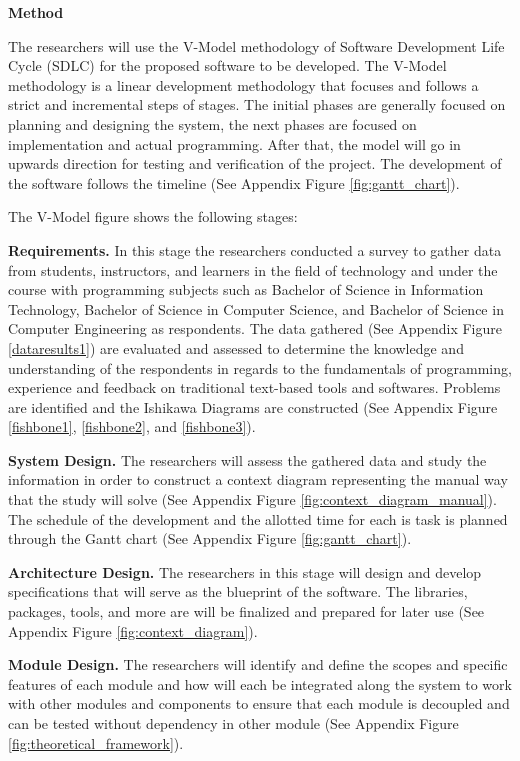 \flushleft
\textbf{Method}\\
\justifying

\parx
The researchers will use the V-Model methodology of Software
Development Life Cycle (SDLC) for the proposed software to be developed. The
V-Model methodology is a linear development methodology that focuses and follows
a strict and incremental steps of stages. The initial phases are generally
focused on planning and designing the system, the next phases are focused on
implementation and actual programming. After that, the model will go in upwards
direction for testing and verification of the project. The development of the
software follows the timeline (See Appendix Figure \ref{fig:gantt_chart}).

\parx
The V-Model figure shows the following stages:

\flushleft
\textbf{Requirements.}
\justifying
\parx
In this stage the researchers conducted a survey to gather data from
students, instructors, and learners in the field of technology and under the
course with programming subjects such as Bachelor of Science in Information
Technology, Bachelor of Science in Computer Science, and Bachelor of Science in
Computer Engineering as respondents. The data gathered
(See Appendix Figure \ref{dataresults1})
are evaluated and assessed to determine the knowledge and understanding of
the respondents in regards to the fundamentals of programming, experience and
feedback on traditional text-based tools and softwares. Problems are identified
and the Ishikawa Diagrams are constructed
(See Appendix Figure \ref{fishbone1}, \ref{fishbone2}, and
\ref{fishbone3}).

\flushleft
\textbf{System Design.}
\justifying
The researchers will assess the gathered data and study the information in order
to construct a context diagram representing the manual way that the study will
solve (See Appendix Figure \ref{fig:context_diagram_manual}). The schedule of the
development and the allotted time for each is task is planned through the Gantt
chart (See Appendix Figure \ref{fig:gantt_chart}).

\flushleft
\textbf{Architecture Design.}
\justifying
\parx
The researchers in this stage will design and develop specifications that will
serve as the blueprint of the software. The libraries, packages, tools, and more
are will be finalized and prepared for later use
(See Appendix Figure \ref{fig:context_diagram}).

\flushleft
\textbf{Module Design.}
\justifying
\parx
The researchers will identify and define the scopes and specific features of
each module and how will each be integrated along the system to work with other
modules and components to ensure that each module is decoupled and can be tested
without dependency in other module
(See Appendix Figure \ref{fig:theoretical_framework}).


